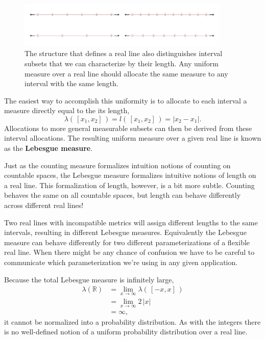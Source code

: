 \documentclass[
  letterpaper,
  DIV=11,
  numbers=noendperiod]{scrartcl}
\begin{document}
\begin{figure}

{\centering \includegraphics[width=0.9\textwidth,height=\textheight]{figures/interval_partitions/interval_partitions.pdf}

}

\caption{\label{fig-equal-length-intervals}The structure that defines a
real line also distinguishes interval subsets that we can characterize
by their length. Any uniform measure over a real line should allocate
the same measure to any interval with the same length.}

\end{figure}

The easiest way to accomplish this uniformity is to allocate to each
interval a measure directly equal to the its length, \[
\lambda( \, [x_{1}, x_{2}] \, )
= l( \, [x_{1}, x_{2}] \, )
= | x_{2} - x_{1} |.
\] Allocations to more general measurable subsets can then be derived
from these interval allocations. The resulting uniform measure over a
given real line is known as the \textbf{Lebesgue measure}.

Just as the counting measure formalizes intuition notions of counting on
countable spaces, the Lebesgue measure formalizes intuitive notions of
length on a real line. This formalization of length, however, is a bit
more subtle. Counting behaves the same on all countable spaces, but
length can behave differently across different real lines!

Two real lines with incompatible metrics will assign different lengths
to the same intervals, resulting in different Lebesgue measures.
Equivalently the Lebesgue measure can behave differently for two
different parameterizations of a flexible real line. When there might be
any chance of confusion we have to be careful to communicate which
parameterization we're using in any given application.

Because the total Lebesgue measure is infinitely large, \begin{align*}
\lambda(\mathbb{R})
&=
\lim_{x \rightarrow \infty} \lambda( \, [-x, x] \, )
\\
&=
\lim_{x \rightarrow \infty} 2 \, | x |
\\
&=
\infty,
\end{align*} it cannot be normalized into a probability distribution. As
with the integers there is no well-defined notion of a uniform
probability distribution over a real line.
\end{document}
